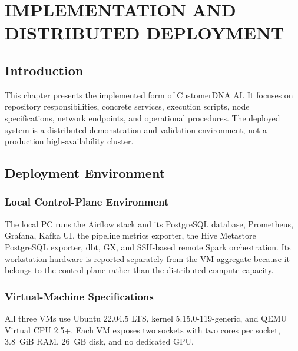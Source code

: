 \clearpage
\chapter{IMPLEMENTATION AND DISTRIBUTED DEPLOYMENT}

\section{Introduction}
This chapter presents the implemented form of CustomerDNA AI. It focuses on repository responsibilities, concrete services, execution scripts, node specifications, network endpoints, and operational procedures. The deployed system is a distributed demonstration and validation environment, not a production high-availability cluster.

\section{Deployment Environment}

\subsection{Local Control-Plane Environment}
The local PC runs the Airflow stack and its PostgreSQL database, Prometheus, Grafana, Kafka UI, the pipeline metrics exporter, the Hive Metastore PostgreSQL exporter, dbt, GX, and SSH-based remote Spark orchestration. Its workstation hardware is reported separately from the VM aggregate because it belongs to the control plane rather than the distributed compute capacity.

\subsection{Virtual-Machine Specifications}
All three VMs use Ubuntu 22.04.5 LTS, kernel 5.15.0-119-generic, and QEMU Virtual CPU 2.5+. Each VM exposes two sockets with two cores per socket, 3.8~GiB RAM, 26~GB disk, and no dedicated GPU.

